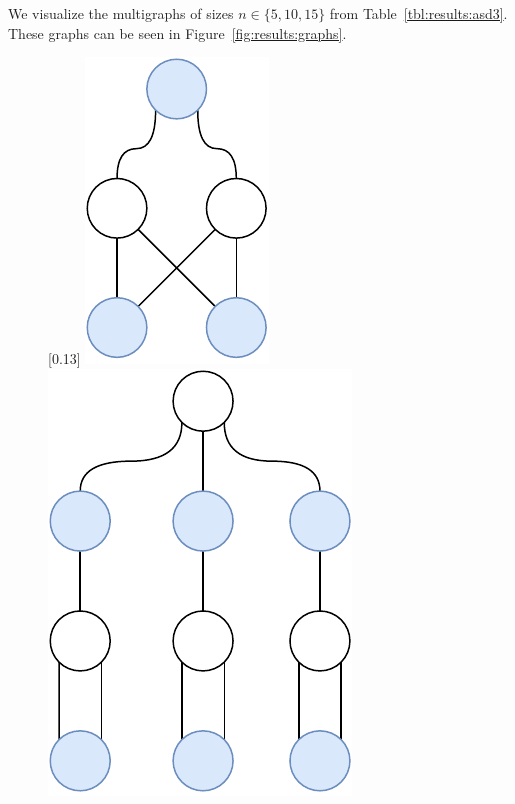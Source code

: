 We visualize the multigraphs of sizes $n \in \{5,10,15\}$ from Table~\ref{tbl:results:asd3}.
These graphs can be seen in Figure~\ref{fig:results:graphs}.

\begin{figure}[H]
  \captionsetup{justification=centering}
    [0.13\textwidth]
    {
      \centering
      \includegraphics[scale=0.35]{diagrams/results_multigraph_n5_1.pdf}
    }
    \hfill
       {
      \centering
      \includegraphics[scale=0.35]{diagrams/results_multigraph_n10_1.pdf}
}
\end{figure}
